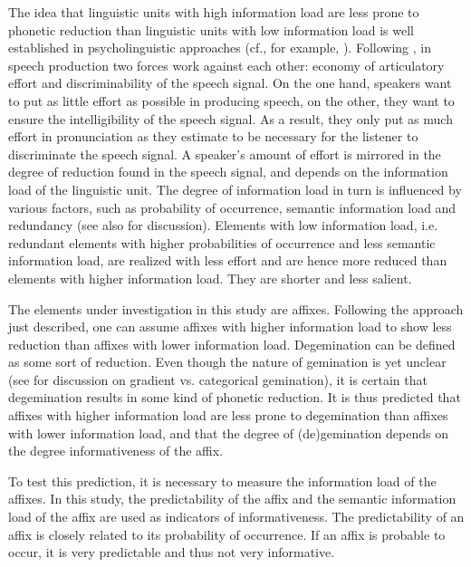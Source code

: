 {The idea that linguistic units with high information load are less prone to phonetic reduction than linguistic units with low information load is well established in psycholinguistic approaches  (cf., for example, \citealt{Aylett.2004,Kuperman.2007,Pluymaekers.2010,Hanique.2012}). Following \cite{Lindblom.1990}, in speech production two forces work against each other: economy of articulatory effort and discriminability of the speech signal. On the one hand, speakers want to put as little effort as possible in producing speech, on the other, they want to ensure the intelligibility of the speech signal. As a result, they only put as much effort in pronunciation as they estimate to be necessary for the listener to discriminate the speech signal. A speaker's amount of effort is mirrored in the degree of reduction found in the speech signal, and depends on the information load of the linguistic unit. The degree of information load in turn is influenced by various factors, such as probability of occurrence, semantic information load and redundancy (see also \cite{Kuperman.2007} for discussion).  
Elements with low information load, i.e. redundant elements with higher probabilities of occurrence and less semantic information load, are realized with less effort and are hence more reduced than elements with higher information load. They are shorter and less salient. 

The elements under investigation in this study are affixes. Following the approach just described, one can assume affixes with higher information load to show less reduction than affixes with lower information load. Degemination can be defined as some sort of reduction. Even though the nature of gemination is yet unclear (see  for discussion on gradient vs. categorical gemination), it is certain that degemination results in some kind of phonetic reduction. It is thus predicted that affixes with higher information load are less prone to degemination than affixes with lower information load, and that the degree of (de)gemination depends on the degree informativeness of the affix.

To test this prediction, it is necessary to measure the information load of the affixes.
 In this study, the predictability of the affix and the semantic information load of the affix are used as indicators of informativeness.
The predictability of an affix is closely related to its probability of occurrence. 
 If an affix is probable to occur, it is very predictable and thus not very informative. %

}
